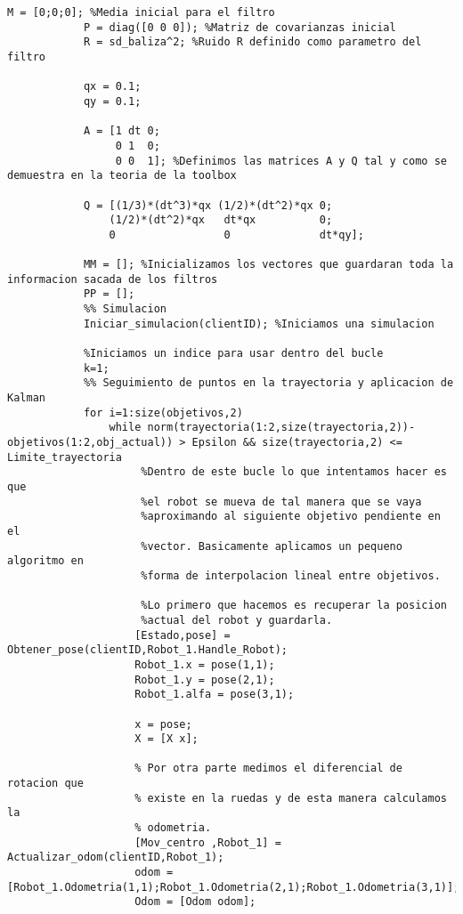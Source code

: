 \begin{lstlisting}[frame=single]
            M = [0;0;0]; %Media inicial para el filtro
            P = diag([0 0 0]); %Matriz de covarianzas inicial
            R = sd_baliza^2; %Ruido R definido como parametro del filtro 

            qx = 0.1;
            qy = 0.1;

            A = [1 dt 0;
                 0 1  0;
                 0 0  1]; %Definimos las matrices A y Q tal y como se demuestra en la teoria de la toolbox

            Q = [(1/3)*(dt^3)*qx (1/2)*(dt^2)*qx 0;
                (1/2)*(dt^2)*qx   dt*qx          0;
                0                 0              dt*qy];

            MM = []; %Inicializamos los vectores que guardaran toda la informacion sacada de los filtros
            PP = [];
            %% Simulacion
            Iniciar_simulacion(clientID); %Iniciamos una simulacion 

            %Iniciamos un indice para usar dentro del bucle
            k=1;
            %% Seguimiento de puntos en la trayectoria y aplicacion de Kalman
            for i=1:size(objetivos,2)
                while norm(trayectoria(1:2,size(trayectoria,2))-objetivos(1:2,obj_actual)) > Epsilon && size(trayectoria,2) <= Limite_trayectoria
                     %Dentro de este bucle lo que intentamos hacer es que
                     %el robot se mueva de tal manera que se vaya
                     %aproximando al siguiente objetivo pendiente en el
                     %vector. Basicamente aplicamos un pequeno algoritmo en
                     %forma de interpolacion lineal entre objetivos.
                     
                     %Lo primero que hacemos es recuperar la posicion
                     %actual del robot y guardarla.
                    [Estado,pose] = Obtener_pose(clientID,Robot_1.Handle_Robot);
                    Robot_1.x = pose(1,1);
                    Robot_1.y = pose(2,1);
                    Robot_1.alfa = pose(3,1);
                   
                    x = pose;
                    X = [X x];
                    
                    % Por otra parte medimos el diferencial de rotacion que
                    % existe en la ruedas y de esta manera calculamos la
                    % odometria.
                    [Mov_centro ,Robot_1] = Actualizar_odom(clientID,Robot_1);
                    odom = [Robot_1.Odometria(1,1);Robot_1.Odometria(2,1);Robot_1.Odometria(3,1)];
                    Odom = [Odom odom];
     

\end{lstlisting}
